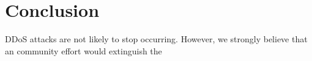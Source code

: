 \section{Conclusion}

DDoS attacks are not likely to stop occurring. However, we strongly believe that an community effort would extinguish the 
